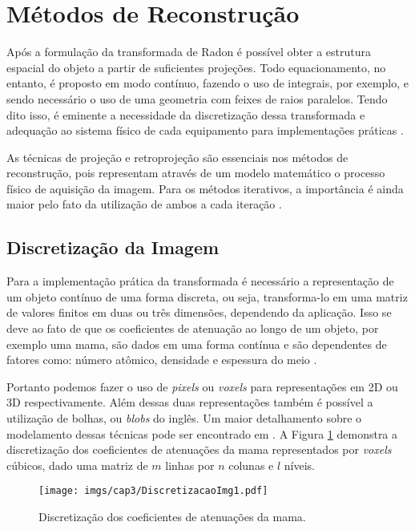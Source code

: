\section{Métodos de Reconstrução}

Após a formulação da transformada de Radon é possível obter a estrutura espacial do objeto a partir de suficientes projeções. Todo equacionamento, no entanto, é proposto em modo contínuo, fazendo o uso de integrais, por exemplo, e sendo necessário o uso de uma geometria com feixes de raios paralelos. Tendo dito isso, é eminente a necessidade da discretização dessa transformada e adequação ao sistema físico de cada equipamento para implementações práticas \cite{levakhina2014three}. 

As técnicas de projeção e retroprojeção são essenciais nos métodos de reconstrução, pois representam através de um modelo matemático o processo físico de aquisição da imagem. Para os métodos iterativos, a importância é ainda maior pelo fato da utilização de ambos a cada iteração \cite{levakhina2014three}.   

\subsection{Discretização da Imagem}\label{DiscretizaçãodaImagem}

Para a implementação prática da transformada é necessário a representação de um objeto contínuo de uma forma discreta, ou seja, transforma-lo em uma matriz de valores finitos em duas ou três dimensões, dependendo da aplicação. Isso se deve ao fato de que os coeficientes de atenuação ao longo de um objeto, por exemplo uma mama, são dados em uma forma contínua e são dependentes de fatores como: número atômico, densidade e espessura do meio \cite{yang2012numerical}.  

Portanto podemos fazer o uso de \textit{pixels} ou \textit{voxels} para representações em \acs{2D} ou \acs{3D} respectivamente. Além dessas duas representações também é possível a utilização de bolhas, ou \textit{blobs} do inglês. Um maior detalhamento sobre o modelamento dessas técnicas pode ser encontrado em  . A Figura \ref{fig:imgCap3DiscretizacaoImagem1} demonstra a discretização dos coeficientes de atenuações da mama representados por \textit{voxels} cúbicos, dado uma matriz de $m$ linhas por $n$ colunas e $l$ níveis.   

\begin{figure}[H]
	\caption{Discretização dos coeficientes de atenuações da mama.}
	\begin{center}
		\texttt{[image: imgs/cap3/DiscretizacaoImg1.pdf]}
	\end{center}
	\label{fig:imgCap3DiscretizacaoImagem1}
\end{figure}

